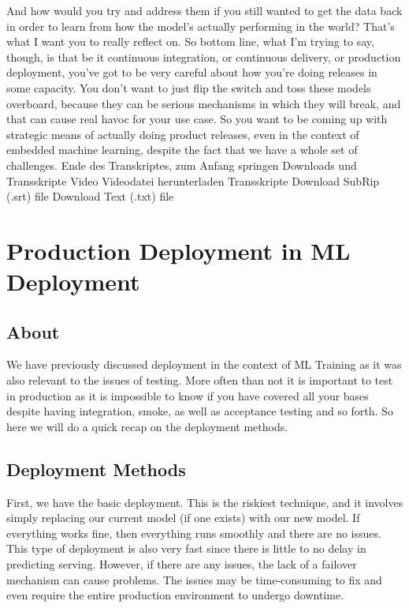 {{{{    And how would you try and address them if you still
    wanted to get the data back in order to learn from how the model's actually
    performing in the world?
    That's what I want you to really reflect on.
    So bottom line, what I'm trying to say, though,
    is that be it continuous integration, or continuous delivery,
    or production deployment, you've got to be very careful about how
    you're doing releases in some capacity.
    You don't want to just flip the switch and toss these models overboard,
    because they can be serious mechanisms in which they will break,
    and that can cause real havoc for your use case.
    So you want to be coming up with strategic means of actually doing
    product releases, even in the context of embedded machine learning,
    despite the fact that we have a whole set of challenges.
    Ende des Transkriptes, zum Anfang springen
    Downloads und Transskripte
    Video
    Videodatei herunterladen
    Transskripte
    Download SubRip (.srt) file
    Download Text (.txt) file
    
    
\section{Production Deployment in ML Deployment}

\subsection{About}

    We have previously discussed deployment in the context of ML Training as it was also relevant to the issues of testing. More often than not it is important to test in production as it is impossible to know if you have covered all your bases despite having integration, smoke, as well as acceptance testing and so forth. So here we will do a quick recap on the deployment methods.
    
\subsection{Deployment Methods}

    First, we have the basic deployment. This is the riskiest technique, and it involves simply replacing our current model (if one exists) with our new model. If everything works fine, then everything runs smoothly and there are no issues. This type of deployment is also very fast since there is little to no delay in predicting serving. However, if there are any issues, the lack of a failover mechanism can cause problems. The issues may be time-consuming to fix and even require the entire production environment to undergo downtime.
    
}}}}
